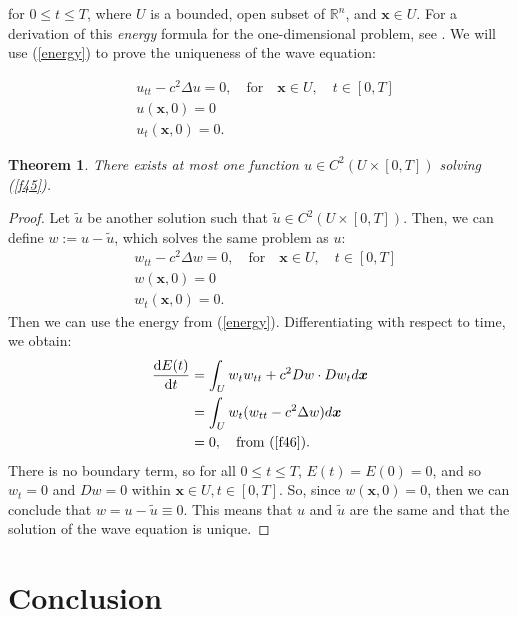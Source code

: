 \documentclass[a4paper, 12pt]{article}
\numberwithin{equation}{section}
\begin{document}
for $0 \le t \le T$, where $U$ is a bounded, open subset of $\mathbb{R}^n$, and
$\boldsymbol{x} \in U$. For a derivation of this \emph{energy} formula for the
one-dimensional problem, see \cite[Section 3.6.4]{Kev}. We will use
(\ref{energy}) to prove the uniqueness of the wave equation:

\begin{equation} \label{f45}
    \begin{aligned}
        &u_{tt}-c^2\Delta u =0, \quad \textrm{for} \quad \boldsymbol{x} \in U, \quad t \in [0,T]\\
        &u(\boldsymbol{x}, 0)=0\\
        &u_t(\boldsymbol{x}, 0)=0.
    \end{aligned}
\end{equation}

\newtheorem*{theorem}{Theorem}
\begin{theorem}
    There exists at most one function $u \in C^2(U \times [0,T])$ solving
    (\ref{f45}).
\end{theorem}

\begin{proof}
    Let $\tilde{u}$ be another solution such that $\tilde{u} \in C^2(U \times
    [0,T])$. Then, we can define $w:=u-\tilde{u}$, which solves the same problem
    as $u$:
    \begin{equation} \label{f46}
        \begin{aligned}
            &w_{tt}-c^2\Delta w =0, \quad \textrm{for} \quad \boldsymbol{x} \in U, \quad t \in [0,T]\\
            &w(\boldsymbol{x}, 0)=0\\
            &w_t(\boldsymbol{x}, 0)=0.
        \end{aligned}
    \end{equation}
    Then we can use the energy from (\ref{energy}). Differentiating with respect
    to time, we obtain:
    \begin{equation*}
        \begin{aligned}
            \diff{E(t)}{t}&=\int_U w_t w_{tt} + c^2 Dw \cdot Dw_t d\boldsymbol{x}\\
            &=\int_U w_t (w_{tt}-c^2 \Delta w)d\boldsymbol{x}\\
            &=0, \quad \textrm{from (\ref{f46})}.
        \end{aligned}
    \end{equation*}
    There is no boundary term, so for all $0 \le t \le T$, $E(t)=E(0)=0$, and so
    $w_t=0$ and $Dw=0$ within $\boldsymbol{x} \in U, t \in [0,T]$. So, since
    $w(\boldsymbol{x}, 0)=0$, then we can conclude that $w=u-\tilde{u}\equiv 0$.
    This means that $u$ and $\tilde{u}$ are the same and that the solution of
    the wave equation is unique.
\renewcommand\qedsymbol{q.e.d.}
\end{proof}

\section{Conclusion}

\newpage 



\end{document}
